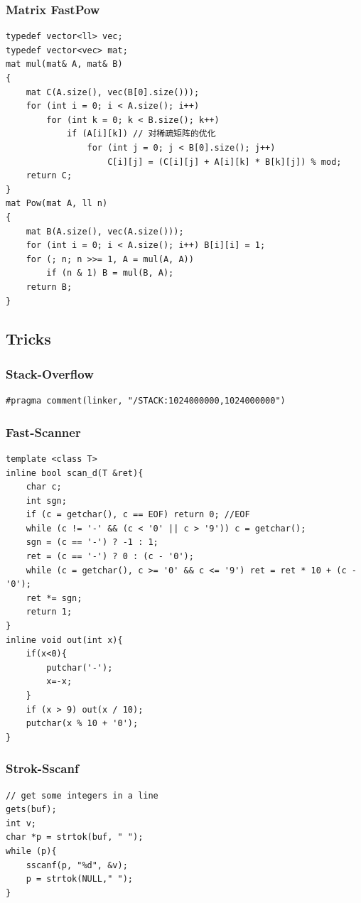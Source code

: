 \documentclass[twoside]{article}
\begin{document}
\subsubsection{Matrix FastPow}
\begin{lstlisting}
typedef vector<ll> vec;
typedef vector<vec> mat;
mat mul(mat& A, mat& B)
{
    mat C(A.size(), vec(B[0].size()));
    for (int i = 0; i < A.size(); i++)
        for (int k = 0; k < B.size(); k++)
            if (A[i][k]) // 对稀疏矩阵的优化
                for (int j = 0; j < B[0].size(); j++)
                    C[i][j] = (C[i][j] + A[i][k] * B[k][j]) % mod;
    return C;
}
mat Pow(mat A, ll n)
{
    mat B(A.size(), vec(A.size()));
    for (int i = 0; i < A.size(); i++) B[i][i] = 1;
    for (; n; n >>= 1, A = mul(A, A))
        if (n & 1) B = mul(B, A);
    return B;
}
\end{lstlisting}
\subsection{Tricks}
\subsubsection{Stack-Overflow}
\begin{lstlisting}
#pragma comment(linker, "/STACK:1024000000,1024000000")
\end{lstlisting}
\subsubsection{Fast-Scanner}
\begin{lstlisting}
template <class T>
inline bool scan_d(T &ret){
    char c;
    int sgn;
    if (c = getchar(), c == EOF) return 0; //EOF
    while (c != '-' && (c < '0' || c > '9')) c = getchar();
    sgn = (c == '-') ? -1 : 1;
    ret = (c == '-') ? 0 : (c - '0');
    while (c = getchar(), c >= '0' && c <= '9') ret = ret * 10 + (c - '0');
    ret *= sgn;
    return 1;
}
inline void out(int x){
    if(x<0){
        putchar('-');
        x=-x;
    }
    if (x > 9) out(x / 10);
    putchar(x % 10 + '0');
}
\end{lstlisting}
\subsubsection{Strok-Sscanf}
\begin{lstlisting}
// get some integers in a line
gets(buf);
int v;
char *p = strtok(buf, " ");
while (p){
    sscanf(p, "%d", &v);
    p = strtok(NULL," ");
}
\end{lstlisting}
\end{document}

